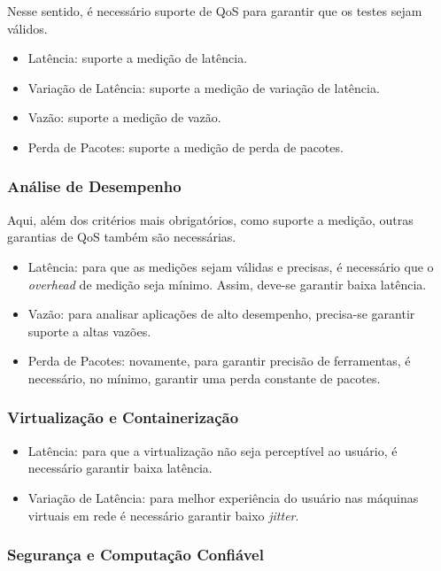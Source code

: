 Nesse sentido, é necessário suporte de QoS para garantir que os
testes sejam válidos.

\begin{itemize}
    \item Latência: suporte a medição de latência.
    \item Variação de Latência: suporte a medição de variação de latência.
    \item Vazão: suporte a medição de vazão.
    \item Perda de Pacotes: suporte a medição de perda de pacotes.
\end{itemize}

\subsubsection{Análise de Desempenho}

Aqui, além dos critérios mais obrigatórios, como suporte a medição,
outras garantias de QoS também são necessárias.

\begin{itemize}
    \item Latência: para que as medições sejam válidas e precisas,
        é necessário que o \textit{overhead} de medição seja mínimo.
        Assim, deve\--se garantir baixa latência.
    \item Vazão: para analisar aplicações de alto desempenho,
        precisa\--se garantir suporte a altas vazões.
    \item Perda de Pacotes: novamente, para garantir precisão
        de ferramentas, é necessário, no mínimo, garantir
        uma perda constante de pacotes.
\end{itemize}

\subsubsection{Virtualização e Containerização}

\begin{itemize}
    \item Latência: para que a virtualização não seja perceptível
        ao usuário, é necessário garantir baixa latência.
    \item Variação de Latência: para melhor experiência do usuário nas máquinas virtuais em rede
        é necessário garantir baixo \textit{jitter}.
\end{itemize}

\subsubsection{Segurança e Computação Confiável}

